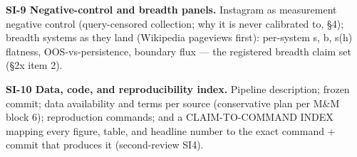 \documentclass[9pt,twocolumn,twoside]{pnas-new}
\begin{document}
{\textbf{SI-9 Negative-control and breadth panels.} Instagram as
measurement negative control (query-censored collection; why it is never
calibrated to, \S4); breadth systems as they land (Wikipedia pageviews
first): per-system s, b, s(h) flatness, OOS-vs-persistence, boundary flux
— the registered breadth claim set (\S2x item 2).

\textbf{SI-10 Data, code, and reproducibility index.} Pipeline
description; frozen commit; data availability and terms per source
(conservative plan per M\&M block 6); reproduction commands; and a
CLAIM-TO-COMMAND INDEX mapping every figure, table, and headline number to
the exact command + commit that produces it (second-review SI4).
}

\end{document}
